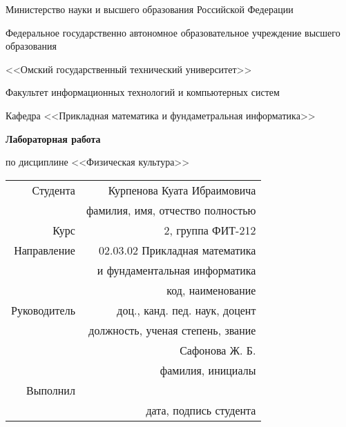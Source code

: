 \documentclass[14pt, a4paper]{article}
\begin{document}
    \pagestyle{empty}

    \begin{center}
        Министерство науки и высшего образования Российской Федерации

        Федеральное государственно автономное образовательное учреждение высшего образования

        <<Омский государственный технический университет>>

        \vspace{1cm}
        Факультет информационных технологий и компьютерных систем

        Кафедра <<Прикладная математика и фундаметральная информатика>>

        \vspace{3cm}
        \textbf{Лабораторная работа}

        по дисциплине <<Физическая культура>>
    \end{center}
    
    \vspace{3cm}
    \begin{flushright}
        \begin{tabular}{ r r }
            Студента & Курпенова Куата Ибраимовича \\
            \cline{2-2}
            & \tiny{фамилия, имя, отчество полностью} \\

            Курс & 2, группа ФИТ-212 \\
            \cline{2-2}
            Направление & 02.03.02 Прикладная математика \\
            \cline{2-2}
            & и фундаментальная информатика \\
            \cline{2-2}
            & \tiny{код, наименование} \\
            
            Руководитель & доц., канд. пед. наук, доцент \\
            \cline{2-2}
            & \tiny{должность, ученая степень, звание} \\
            & Сафонова Ж. Б. \\
            \cline{2-2}
            & \tiny{фамилия, инициалы} \\
            
            Выполнил & \\
            \cline{2-2}
            & \tiny{дата, подпись студента} \\
            
        \end{tabular}
    \end{flushright}
    
\end{document}
